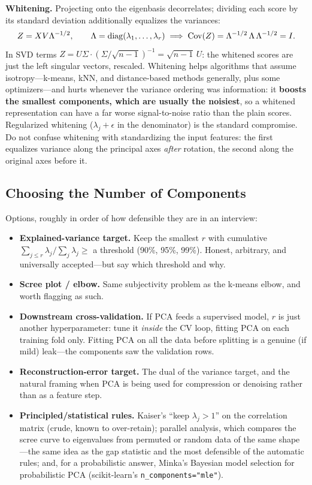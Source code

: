 \textbf{Whitening.} Projecting onto the eigenbasis decorrelates; dividing each score by its standard deviation additionally equalizes the variances:
\begin{equation}
Z = X V \Lambda^{-1/2}, \qquad \Lambda = \operatorname{diag}(\lambda_1, \ldots, \lambda_r) \;\Longrightarrow\; \operatorname{Cov}(Z) = \Lambda^{-1/2}\,\Lambda\,\Lambda^{-1/2} = I .
\end{equation}
In SVD terms $Z = U\Sigma \cdot (\Sigma/\sqrt{n-1})^{-1} = \sqrt{n-1}\,U$: the whitened scores are just the left singular vectors, rescaled. Whitening helps algorithms that assume isotropy---k-means, kNN, and distance-based methods generally, plus some optimizers---and hurts whenever the variance ordering was information: it \textbf{boosts the smallest components, which are usually the noisiest}, so a whitened representation can have a far worse signal-to-noise ratio than the plain scores. Regularized whitening ($\lambda_j + \epsilon$ in the denominator) is the standard compromise. Do not confuse whitening with standardizing the input features: the first equalizes variance along the principal axes \emph{after} rotation, the second along the original axes before it.

\subsection{Choosing the Number of Components}

Options, roughly in order of how defensible they are in an interview:
\begin{itemize}
    \item \textbf{Explained-variance target.} Keep the smallest $r$ with cumulative $\sum_{j\le r}\lambda_j / \sum_j \lambda_j \ge$ a threshold (90\%, 95\%, 99\%). Honest, arbitrary, and universally accepted---but say which threshold and why.
    \item \textbf{Scree plot / elbow.} Same subjectivity problem as the k-means elbow, and worth flagging as such.
    \item \textbf{Downstream cross-validation.} If PCA feeds a supervised model, $r$ is just another hyperparameter: tune it \emph{inside} the CV loop, fitting PCA on each training fold only. Fitting PCA on all the data before splitting is a genuine (if mild) leak---the components saw the validation rows.
    \item \textbf{Reconstruction-error target.} The dual of the variance target, and the natural framing when PCA is being used for compression or denoising rather than as a feature step.
    \item \textbf{Principled/statistical rules.} Kaiser's ``keep $\lambda_j > 1$'' on the correlation matrix (crude, known to over-retain); parallel analysis, which compares the scree curve to eigenvalues from permuted or random data of the same shape---the same idea as the gap statistic and the most defensible of the automatic rules; and, for a probabilistic answer, Minka's Bayesian model selection for probabilistic PCA (scikit-learn's \texttt{n\_components="mle"}).
\end{itemize}

